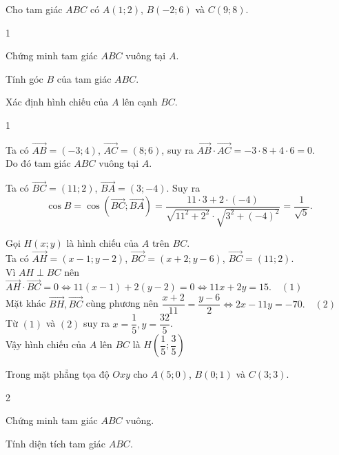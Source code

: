 \begin{bt}%
	Cho tam giác $ABC$ có $A(1;2)$, $B(-2;6)$ và $C(9;8).$
	\begin{enumEX}{1}
		\item Chứng minh tam giác $ABC$ vuông tại $A$.
		\item Tính góc $B$ của tam giác $ABC$.
		\item Xác định hình chiếu của $A$ lên cạnh $BC$.
	\end{enumEX}
	\loigiai
	{
		\begin{enumEX}{1}
			\item Ta có $\overrightarrow{AB}=(-3;4)$, $\overrightarrow{AC}=(8;6)$, suy ra $\overrightarrow{AB}\cdot \overrightarrow{AC}=-3\cdot 8+4\cdot 6=0$.\\
			Do đó tam giác $ABC$ vuông tại $A$.
			\item Ta có $\overrightarrow{BC}=(11;2)$, $\overrightarrow{BA}=(3;-4)$. Suy ra 
			$$\cos B=\cos(\overrightarrow{BC};\overrightarrow{BA})=\dfrac{11\cdot 3+2\cdot(-4)}{\sqrt{11^2+2^2}\cdot \sqrt{3^2+(-4)^2}}=\dfrac{1}{\sqrt{5}}.$$
			\item Gọi $H(x;y)$ là hình chiếu của $A$ trên $BC$.\\
			Ta có $\overrightarrow{AH}=(x-1;y-2)$, $\overrightarrow{BC}=(x+2;y-6)$, $\overrightarrow{BC}=(11;2)$.\\
			Vì $AH\perp BC$ nên $\overrightarrow{AH}\cdot \overrightarrow{BC}=0\Leftrightarrow 11(x-1)+2(y-2)=0\Leftrightarrow 11x+2y=15.\quad(1)$\\
			Mặt khác $\overrightarrow{BH}, \overrightarrow{BC}$ cùng phương nên $\dfrac{x+2}{11}=\dfrac{y-6}{2}\Leftrightarrow 2x-11y=-70.\quad (2)$\\
			Từ $(1)$ và $(2)$ suy ra $x=\dfrac{1}{5}, y=\dfrac{32}{5}$.\\
			Vậy hình chiếu của $A$ lên $BC$ là $H\left(\dfrac{1}{5};\dfrac{3}{5}\right)$
		\end{enumEX}
	}
\end{bt}

\begin{bt}%
	Trong mặt phẳng tọa độ $ Oxy$ cho $A( 5 ; 0 )$, $B( 0 ; 1 )$ và $C(3;3)$. 
	\begin{enumEX}[a)]{2}
		\item Chứng minh tam giác $ABC$ vuông.
		\item  Tính diện tích tam giác $ABC$.
	\end{enumEX}  
\end{bt}

